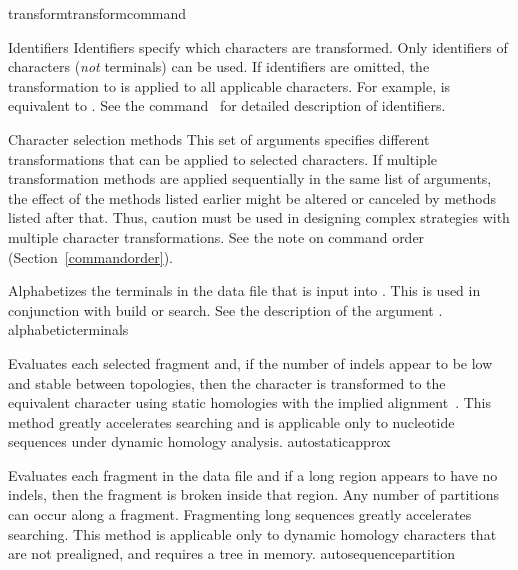 \begin{command}{transform}{transformcommand}
    \begin{arguments}
    
        \begin{argumentgroup}{Identifiers}
            Identifiers specify which characters are transformed. Only
            identifiers of characters (\emph{not} terminals) can be used. If
            identifiers are omitted, the transformation to is applied to all
            applicable characters. For example,
             is equivalent to
            . See the command~
            for detailed description of identifiers.
        \end{argumentgroup}
           
        \begin{argumentgroup}{Character selection methods}
            This set of arguments specifies different transformations that can be applied
            to selected characters. If multiple transformation methods are applied
            sequentially in the same list of arguments, the effect of the methods listed
            earlier might be altered or canceled by methods listed after that. Thus, caution
            must be used in designing complex strategies with multiple character
            transformations. See the note on command order (Section~\ref{commandorder}).

                {Alphabetizes the terminals in the data file that is input into \poy.  This is used in 
                conjunction with build or search. See the description of the argument 
                .}
                {alphabeticterminals}
        
                {Evaluates each selected fragment and, if the number of indels
                appear to be low and stable between topologies, then the character
                is transformed to the equivalent character using static homologies
                with the implied alignment~\cite{wheeler2003}.
                This method greatly accelerates searching and is applicable only to 
                nucleotide sequences under dynamic homology analysis.}
                {autostaticapprox}

                {Evaluates each fragment in the data file and if a long region appears 
                to have no indels, then the fragment is broken inside that region.
                Any number of partitions can occur along a fragment. Fragmenting
                long sequences greatly accelerates searching. This method is
                applicable only to dynamic homology characters that are not prealigned, 
                and requires a tree in memory.}
                {autosequencepartition}
                

\end{argumentgroup}
\end{arguments}
\end{command}
